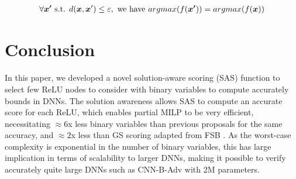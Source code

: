 \documentclass[runningheads]{llncs}
\newcommand{\ReLU}{\mathrm{ReLU}}
\begin{document}
	\begin{align}
	\forall \boldsymbol{x'} \text{ s.t. } d({\bm{x}},{\bm{x}}')\leq \varepsilon, \text{ we have }  
	{argmax (f(\boldsymbol{x'})) = argmax(f(\boldsymbol{x}))}
\end{align} 


\iffalse
In some cases, the output is a vector but the aim to get the label of dimension with the minimal value. In this case, the problem can be written as:\begin{align*}
	\forall \boldsymbol{x} \in\mathcal{D} \  \min f(\boldsymbol{x}) = \min f(\boldsymbol{x}_0)
\end{align*}

If so, the question of verification can turn to the following optimization question: \begin{align*}
	\min f(\boldsymbol{x}) \ s.t. {\boldsymbol{z}}^{i} &= \boldsymbol{W}^i\cdot \hat{\boldsymbol{z}}^{(i-1)}+ b^i\\
	\hat{\boldsymbol{z}}^{i}(n) &= \sigma({\boldsymbol{z}}^i(n)), \boldsymbol{x}\in\mathcal{D}.
\end{align*}

In this paper, we only consider $\ReLU$ function as the activation function: $\sigma(a)=\ReLU(a)=\max(0,a)$. 

In this paper, we consider $L^{\infty}$ norm the max value of distance of each dimension, that is $d(\vx,\boldsymbol{x}_0)=\max |\boldsymbol{x}(n)-\boldsymbol{x}_0(n)|$. 
\fi


 









%




\section{Conclusion}
In this paper, we developed a novel solution-aware scoring ({\sf SAS}) function to select few ReLU nodes to consider with binary variables to compute accurately bounds in DNNs. 
The solution awareness allows SAS to compute an accurate score for each ReLU, which enables partial MILP to be very efficient, necessitating $\approx6$x less binary variables than previous proposals \cite{DivideAndSlide} for the same accuracy, and $\approx2$x less than {\sf GS} scoring adapted from FSB \cite{FSB}. As the worst-case complexity is exponential in the number of binary variables, this has large implication in terms of scalability to larger DNNs, making it possible to verify accurately quite large DNNs such as CNN-B-Adv with 2M parameters. 
\end{document}
